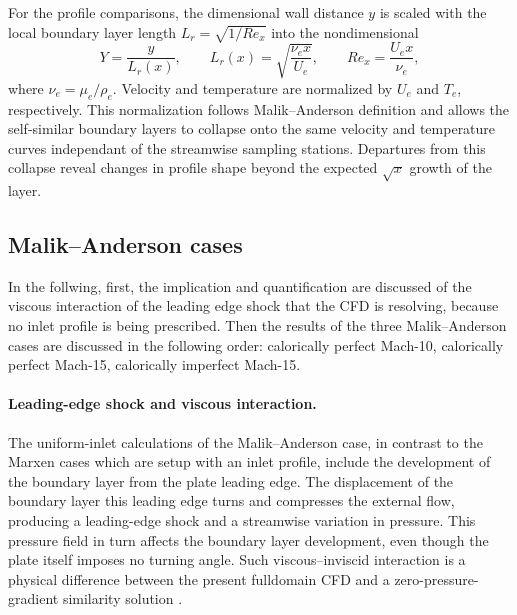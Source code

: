 For the profile comparisons, the dimensional wall distance \(y\) is scaled
with the local boundary layer length $L_r = \sqrt{1/Re_x}$ into the nondimensional
\begin{equation}
    Y=\frac{y}{L_r(x)},
    \qquad
    L_r(x)=\sqrt{\frac{\nu_e x}{U_e}},
    \qquad
    Re_x=\frac{U_e x}{\nu_e},
    \label{eq:laminar-bl-similarity-coordinate}
\end{equation}
where \(\nu_e=\mu_e/\rho_e\). Velocity and temperature are normalized by
\(U_e\) and \(T_e\), respectively. This normalization follows
Malik--Anderson definition and allows the self-similar boundary layers to collapse onto the same
velocity and temperature curves independant of the streamwise sampling stations. Departures
from this collapse reveal changes in profile shape beyond the expected
\(\sqrt{x}\) growth of the layer.

\clearpage
\subsection{Malik--Anderson cases}
\label{subsec:laminar-bl-malik-anderson}

In the follwing, first, the implication and quantification are discussed of the viscous interaction of the leading edge shock that the CFD is resolving, because no inlet profile is being prescribed. Then the results of the three Malik--Anderson cases are discussed in the following order: calorically perfect Mach-10, calorically perfect Mach-15, calorically imperfect Mach-15.

\paragraph{Leading-edge shock and viscous interaction.}
The uniform-inlet calculations of the Malik--Anderson case, in contrast to the Marxen cases which are setup with an inlet profile, include the development of the boundary layer
from the plate leading edge. The displacement of the boundary layer this leading edge turns and compresses the external flow, producing a leading-edge shock and a streamwise variation in
pressure. This pressure field in turn affects the boundary layer development,
even though the plate itself imposes no turning angle. Such viscous--inviscid
interaction is a physical difference between the present fulldomain CFD and a zero-pressure-gradient similarity solution
\citep{Bertram1966ViscousInteraction}.
\par\medskip

